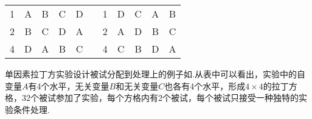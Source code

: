\begin{table}[h]
\begin{tabular}{ccccccccccc}
    1     & \cellcolor[rgb]{ .851,  .882,  .949}A & \cellcolor[rgb]{ .988,  .894,  .839}B & \cellcolor[rgb]{ .929,  .929,  .929}C & \cellcolor[rgb]{ .886,  .937,  .855}D &       & 1     & \cellcolor[rgb]{ .886,  .937,  .855}D & \cellcolor[rgb]{ .929,  .929,  .929}C & \cellcolor[rgb]{ .851,  .882,  .949}A & \cellcolor[rgb]{ .988,  .894,  .839}B \\
    2     & \cellcolor[rgb]{ .851,  .882,  .949}B & \cellcolor[rgb]{ .988,  .894,  .839}C & \cellcolor[rgb]{ .929,  .929,  .929}D & \cellcolor[rgb]{ .886,  .937,  .855}A &       & 2     & \cellcolor[rgb]{ .886,  .937,  .855}A & \cellcolor[rgb]{ .929,  .929,  .929}D & \cellcolor[rgb]{ .851,  .882,  .949}B & \cellcolor[rgb]{ .988,  .894,  .839}C \\
    4     & \cellcolor[rgb]{ .851,  .882,  .949}D & \cellcolor[rgb]{ .988,  .894,  .839}A & \cellcolor[rgb]{ .929,  .929,  .929}B & \cellcolor[rgb]{ .886,  .937,  .855}C &       & 4     & \cellcolor[rgb]{ .886,  .937,  .855}C & \cellcolor[rgb]{ .929,  .929,  .929}B & \cellcolor[rgb]{ .851,  .882,  .949}D & \cellcolor[rgb]{ .988,  .894,  .839}A \\
    \end{tabular}%
\end{table}

单因素拉丁方实验设计被试分配到处理上的例子如.从表中可以看出，实验中的自变量$A$有4个水平，无关变量$B$和无关变量$C$也各有4个水平，形成$4\times 4$的拉丁方格，32个被试参加了实验，每个方格内有2个被试，每个被试只接受一种独特的实验条件处理.

